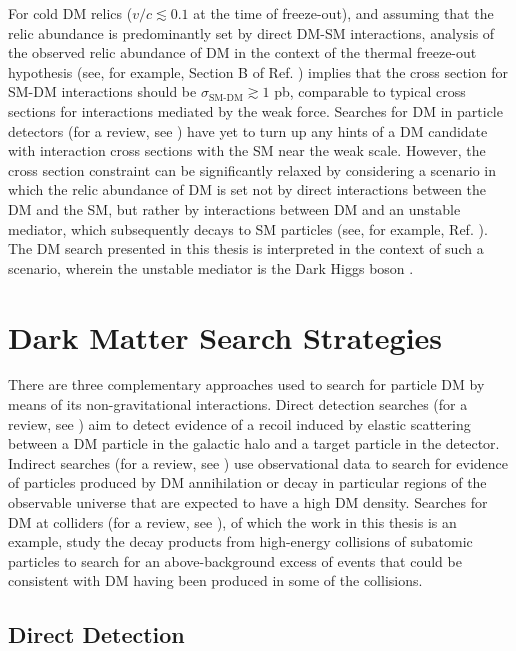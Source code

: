 For cold DM relics (\(v/c\lesssim0.1\) at the time of freeze-out), and assuming that the relic abundance is predominantly set by direct DM-SM interactions, analysis of the observed relic abundance of DM in the context of the thermal freeze-out hypothesis (see, for example, Section B of Ref. \cite{dm_xsec_2015}) implies that the cross section for SM-DM interactions should be \(\sigma_\text{SM-DM}\gtrsim1\) pb, comparable to typical cross sections for interactions mediated by the weak force. Searches for DM in particle detectors (for a review, see \cite{wimp_searches_2018}) have yet to turn up any hints of a DM candidate with interaction cross sections with the SM near the weak scale. However, the cross section constraint can be significantly relaxed by considering a scenario in which the relic abundance of DM is set not by direct interactions between the DM and the SM, but rather by interactions between DM and an unstable mediator, which subsequently decays to SM particles (see, for example, Ref. \cite{secluded_dm_2008}). The DM search presented in this thesis is interpreted in the context of such a scenario, wherein the unstable mediator is the Dark Higgs boson \cite{Duerr_2016,Duerr2017}.

\section{Dark Matter Search Strategies}

There are three complementary approaches used to search for particle DM by means of its non-gravitational interactions. Direct detection searches (for a review, see \cite{billard2021direct}) aim to detect evidence of a recoil induced by elastic scattering between a DM particle in the galactic halo and a target particle in the detector. Indirect searches (for a review, see \cite{CIRELLI_2012}) use observational data to search for evidence of particles produced by DM annihilation or decay in particular regions of the observable universe that are expected to have a high DM density. Searches for DM at colliders (for a review, see \cite{DM_colliders}), of which the work in this thesis is an example, study the decay products from high-energy collisions of subatomic particles to search for an above-background excess of events that could be consistent with DM having been produced in some of the collisions.

\subsection{Direct Detection}

